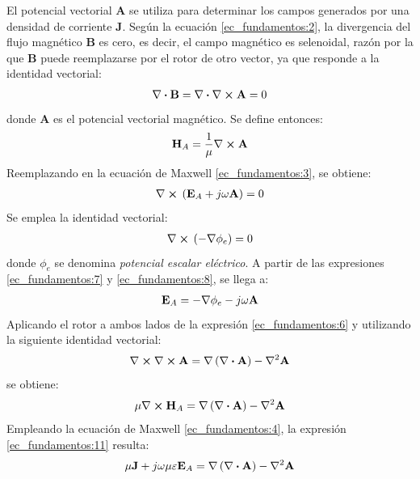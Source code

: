 El potencial vectorial $\mathbf{A}$ se utiliza para determinar los campos generados por una densidad de corriente $\mathbf{J}$. Según la ecuación \eqref{ec_fundamentos:2}, la divergencia del flujo magnético $\mathbf{B}$ es cero, es decir, el campo magnético es selenoidal, razón por la que $\mathbf{B}$ puede reemplazarse por el rotor de otro vector, ya que responde a la identidad vectorial:
\begin{align}
\nabla\boldsymbol{\cdot}\mathbf{B} = \nabla\boldsymbol{\cdot}\mathbf{}\nabla\boldsymbol{\times}\mathbf{A} = 0
\label{ec_fundamentos:5}
\end{align}
donde $\mathbf{A}$ es el potencial vectorial magnético. Se define entonces:
\begin{align}
\mathbf{H}_A = \frac{1}{\mu}\nabla\boldsymbol{\times}\mathbf{A}
\label{ec_fundamentos:6}
\end{align}
Reemplazando en la ecuación de Maxwell \eqref{ec_fundamentos:3}, se obtiene:
\begin{align}
\nabla\boldsymbol{\times}\mathbf{}\left(\mathbf{E}_A + j\omega\mathbf{A}\right) = 0
\label{ec_fundamentos:7}
\end{align}
Se emplea la identidad vectorial:
\begin{align}
\nabla\boldsymbol{\times}\mathbf{}\left(- \nabla\phi_e\right) = 0
\label{ec_fundamentos:8}
\end{align}
donde $\phi_e$ se denomina \emph{potencial escalar eléctrico}. A partir de las expresiones \eqref{ec_fundamentos:7} y \eqref{ec_fundamentos:8}, se llega a:
\begin{align}
\mathbf{E}_A = - \nabla\phi_e - j\omega\mathbf{A}
\label{ec_fundamentos:9}
\end{align}
Aplicando el rotor a ambos lados de la expresión \eqref{ec_fundamentos:6} y utilizando la siguiente identidad vectorial:
\begin{align}
\nabla\boldsymbol{\times}\mathbf{}\nabla\boldsymbol{\times}\mathbf{A} = \nabla\left(\nabla\boldsymbol{\cdot}\mathbf{A}\right) - \nabla^2\mathbf{A}
\label{ec_fundamentos:10}
\end{align}
se obtiene:
\begin{align}
\mu\nabla\boldsymbol{\times}\mathbf{H}_A = \nabla\left(\nabla\boldsymbol{\cdot}\mathbf{A}\right) - \nabla^2\mathbf{A}
\label{ec_fundamentos:11}
\end{align}
Empleando la ecuación de Maxwell \eqref{ec_fundamentos:4}, la expresión \eqref{ec_fundamentos:11} resulta:
\begin{align}
\mu\mathbf{J} + j\omega\mu\varepsilon\mathbf{E}_A = \nabla\left(\nabla\boldsymbol{\cdot}\mathbf{A}\right) - \nabla^2\mathbf{A}
\label{ec_fundamentos:12}
\end{align}

